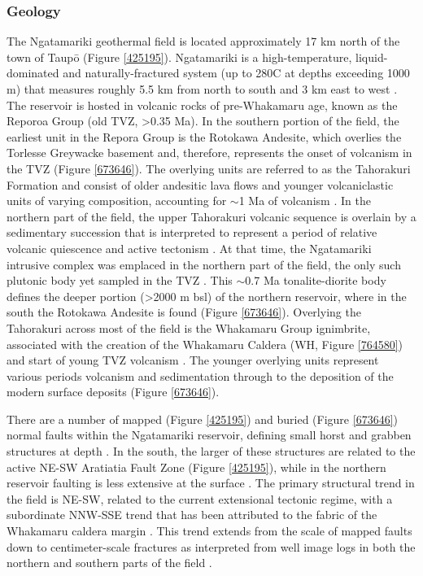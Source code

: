 \subsubsection{Geology}
The Ngatamariki geothermal field is located approximately 17 km north of the town of Taup\={o} (Figure \ref{425195}). Ngatamariki is a high-temperature, liquid-dominated and naturally-fractured system (up to 280\textdegree{}C at depths exceeding 1000 m) that measures roughly 5.5 km from north to south and 3 km east to west \citep{Bignall_2009, Chambefort_2014}. The reservoir is hosted in volcanic rocks of pre-Whakamaru age, known as the Reporoa Group (old TVZ, \textgreater0.35 Ma)\citep{Chambefort_2014}. In the southern portion of the field, the earliest unit in the Repora Group is the Rotokawa Andesite, which overlies the Torlesse Greywacke basement and, therefore, represents the onset of volcanism in the TVZ \citep{Chambefort_2014,Wilson_2016} (Figure \ref{673646}). The overlying units are referred to as the Tahorakuri Formation and consist of older andesitic lava flows and younger volcaniclastic units of varying composition, accounting for $\sim$1 Ma of volcanism \citep{Chambefort_2014}. In the northern part of the field, the upper Tahorakuri volcanic sequence is overlain by a sedimentary succession that is interpreted to represent a period of relative volcanic quiescence and active tectonism \citep{Chambefort_2014}. At that time, the Ngatamariki intrusive complex was emplaced in the northern part of the field, the only such plutonic body yet sampled in the TVZ \citep{Chambefort_2014}. This $\sim$0.7 Ma tonalite-diorite body defines the deeper portion (\textgreater2000 m bsl) of the northern reservoir, where in the south the Rotokawa Andesite is found \citep{Chambefort_2014} (Figure \ref{673646}). Overlying the Tahorakuri across most of the field is the Whakamaru Group ignimbrite, associated with the creation of the Whakamaru Caldera (WH, Figure \ref{764580}) and start of young TVZ volcanism \citep{Chambefort_2014,Wilson_1995}. The younger overlying units represent various periods volcanism and sedimentation through to the deposition of the modern surface deposits \citep{Chambefort_2014} (Figure \ref{673646}).

There are a number of mapped (Figure \ref{425195}) and buried (Figure \ref{673646}) normal faults within the Ngatamariki reservoir, defining small horst and grabben structures at depth \citep{Bignall_2009}. In the south, the larger of these structures are related to the active NE-SW Aratiatia Fault Zone (Figure \ref{425195}), while in the northern reservoir faulting is less extensive at the surface \citep{AFDB}. The primary structural trend in the field is NE-SW, related to the current extensional tectonic regime, with a subordinate NNW-SSE trend that has been attributed to the fabric of the Whakamaru caldera margin \citep{Bignall_2009}. This trend extends from the scale of mapped faults down to centimeter-scale fractures as interpreted from well image logs in both the northern and southern parts of the field \citep{nm09_report,nm10_report,massiot_2012}.

